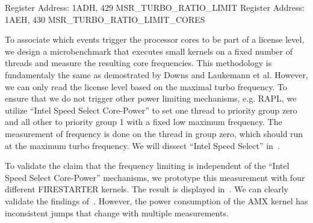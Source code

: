 Register Address: 1ADH, 429 MSR\_TURBO\_RATIO\_LIMIT
Register Address: 1AEH, 430 MSR\_TURBO\_RATIO\_LIMIT\_CORES



To associate which events trigger the processor cores to be part of a license level, we design a microbenchmark that executes small kernels on a fixed number of threads and measure the resulting core frequencies.
This methodology is fundamentaly the same as demostrated by Downs and Laukemann et al.
However, we can only read the license level based on the maximal turbo frequency.
To ensure that we do not trigger other power limiting mechanisms, e.g. RAPL, we utilize ``Intel Speed Select Core-Power'' to set one thread to priority group zero and all other to priority group 1 with a fixed low maximum frequency.
The measurement of frequency is done on the thread in group zero, which should run at the maximum turbo frequency.
We will dissect ``Intel Speed Select'' in~.

To validate the claim that the frequency limiting is independent of the ``Intel Speed Select Core-Power'' mechanisms, we prototype this measurement with four different FIRESTARTER kernels.
The result is displayed in~. We can clearly validate the findings of~.
However, the power consumption of the AMX kernel has inconsistent jumps that change with multiple measurements.




